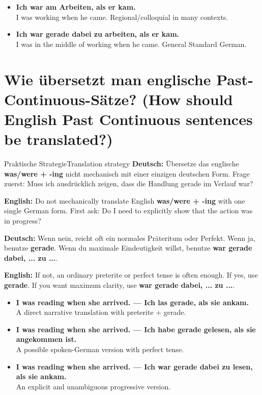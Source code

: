 \documentclass[a4paper,11pt]{article}
\newcommand{\GermanText}[1]{\textbf{Deutsch: }#1\par}
\newcommand{\EnglishText}[1]{{\small\color{SoftGray}\textbf{English: }#1\par}}
\newcommand{\ExampleItem}[2]{\item \textbf{#1}\\{\small\color{SoftGray}#2}}
\begin{document}
        \begin{exbox}
            \begin{itemize}
                \ExampleItem{Ich war am Arbeiten, als er kam.}{I was working when he came. Regional/colloquial in many contexts.}
                \ExampleItem{Ich war gerade dabei zu arbeiten, als er kam.}{I was in the middle of working when he came. General Standard German.}
            \end{itemize}
        \end{exbox}

\section{Wie übersetzt man englische Past-Continuous-Sätze? \textnormal{(How should English Past Continuous sentences be translated?)}}

        \begin{grammarentry}{Praktische Strategie}{Translation strategy}
            \GermanText{Übersetze das englische \textbf{was/were + -ing} nicht mechanisch mit einer einzigen deutschen Form. Frage zuerst: Muss ich ausdrücklich zeigen, dass die Handlung gerade im Verlauf war?}
            \EnglishText{Do not mechanically translate English \textbf{was/were + -ing} with one single German form. First ask: Do I need to explicitly show that the action was in progress?}

            \GermanText{Wenn nein, reicht oft ein normales Präteritum oder Perfekt. Wenn ja, benutze \textbf{gerade}. Wenn du maximale Eindeutigkeit willst, benutze \textbf{war gerade dabei, ... zu ...}.}
            \EnglishText{If not, an ordinary preterite or perfect tense is often enough. If yes, use \textbf{gerade}. If you want maximum clarity, use \textbf{war gerade dabei, ... zu ...}.}
        \end{grammarentry}

        \begin{exbox}
            \begin{itemize}
                \ExampleItem{I was reading when she arrived. --- Ich las gerade, als sie ankam.}{A direct narrative translation with preterite + gerade.}
                \ExampleItem{I was reading when she arrived. --- Ich habe gerade gelesen, als sie angekommen ist.}{A possible spoken-German version with perfect tense.}
                \ExampleItem{I was reading when she arrived. --- Ich war gerade dabei zu lesen, als sie ankam.}{An explicit and unambiguous progressive version.}
            \end{itemize}
        \end{exbox}
\end{document}
